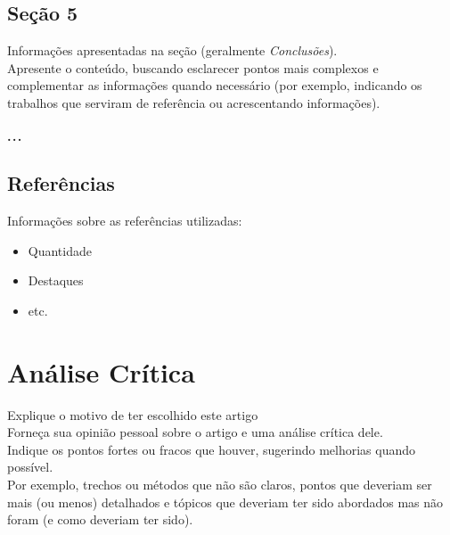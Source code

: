 \documentclass{UnBeamer}%
\begin{document}
    \subsection{Seção 5}%
    \begin{frame}%
        Informações apresentadas na seção (geralmente \emph{Conclusões}).%
        \\\vfill%
        Apresente o conteúdo, buscando esclarecer pontos mais complexos e complementar as informações quando necessário (por exemplo, indicando os trabalhos que serviram de referência ou acrescentando informações).
    \end{frame}%

    \subsection{$\cdots$}%

    \subsection{Referências}%
    \begin{frame}%
        Informações sobre as referências utilizadas:
        \begin{itemize}
            \item Quantidade
            \item Destaques
            \item etc.
        \end{itemize}
    \end{frame}%

    \section{Análise Crítica}%
    \begin{frame}%
        Explique o motivo de ter escolhido este artigo%
        \\\vfill%
        Forneça sua opinião pessoal sobre o artigo e uma análise crítica dele.
        \\\vfill%
        Indique os pontos fortes ou fracos que houver, sugerindo melhorias quando possível.
        \\\vfill%
        Por exemplo, trechos ou métodos que não são claros, pontos que deveriam
        ser mais (ou menos) detalhados e tópicos que deveriam ter sido abordados mas não foram (e como deveriam ter sido).
    \end{frame}%
\end{document}

